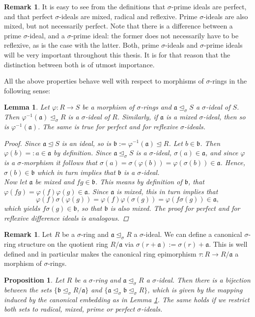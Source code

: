 \documentclass{article}
\def\a{\mathfrak{a}}
\def\b{\mathfrak{b}}
\def\s{\sigma}
\def\si{\unlhd_{\sigma}}
\newenvironment{bew}{\begin{proof}[Proof]}{\end{proof}}
\theoremstyle{plain}
\newtheorem{prop}[Satz]{Proposition}
\newtheorem{lem}[Satz]{Lemma}
\theoremstyle{definition}
\newtheorem{rem}[Satz]{Remark}
\begin{document}
\begin{rem}
It is easy to see from the definitions that $\s$-prime ideals are perfect, and that perfect $\s$-ideals are mixed, radical and reflexive. Prime $\s$-ideals are also mixed, but not necessarily perfect. Note that there is a difference between a prime $\s$-ideal, and a $\s$-prime ideal:
the former does not necessarily have to be reflexive, as is the case with the latter. Both, prime $\s$-ideals and $\s$-prime ideals will be very important throughout this thesis. It is for that reason that the distinction between both is of utmost importance.
\end{rem}

All the above properties behave well with respect to morphisms of $\s$-rings in the following sense:
\begin{lem}\label{bijmapping}
Let $\varphi: R \rightarrow S$ be a morphism of $\s$-rings and $\a \si S$ a $\s$-ideal of $S$. Then $\varphi^{-1}(\a) \si R$ is a $\s$-ideal of $R$. Similarly, if $\a$ is a mixed $\s$-ideal, then so is $\varphi^{-1}(\a)$. The same is true for perfect and for reflexive $\s$-ideals.
\begin{bew}
Since $\a \unlhd S$ is an ideal, so is $\b := \varphi^{-1}(\a) \unlhd R$. Let $b \in \b$. Then $\varphi(b) =: a \in \a$ by definition. Since $\a \si S$ is a $\s$-ideal, $\s(a) \in \a$, and since $\varphi$ is a $\s$-morphism
it follows that $\sigma(a) = \sigma(\varphi(b)) = \varphi (\s (b)) \in \a$. Hence, $\s(b) \in \b$ which in turn implies that $\b$ is a $\s$-ideal. \\
Now let $\a$ be mixed and $fg \in \b$. This means by definition of $\b$, 
that $\varphi(fg) = \varphi(f) \varphi(g) \in \a$. Since $\a$ is mixed, this in turn implies that $$\varphi(f) \s( \varphi(g)) = \varphi(f) \varphi(\s(g)) = \varphi(f\s(g)) \in \a,$$ which yields $f\s(g) \in \b$, so that $\b$ is also mixed. 
The proof for perfect and for reflexive difference ideals is analogous.
\end{bew}
\end{lem}

\begin{rem}
Let $R$ be a $\s$-ring and $\a \si R$ a $\s$-ideal. We can define a canonical $\s$-ring structure on the quotient ring $R/\a$ via $\s(r+\a):= \s(r) + \a$. 
This is well defined and in particular makes the canonical ring epimorphism $\tau: R \rightarrow R/\a$ a morphism of $\s$-rings.
\end{rem}

\begin{prop}\label{bijideals}
Let $R$ be a $\s$-ring and $\a \si R$ a $\s$-ideal. Then there is a bijection between the sets $\{ \b \si R/\a \}$ and $\{ \a \si \b \si R \}$, which is given by the mapping induced by the canonical embedding as in Lemma \ref{bijmapping}. The same holds if we restrict both sets to radical, mixed, prime or perfect $\s$-ideals.
\end{prop}
\end{document}

